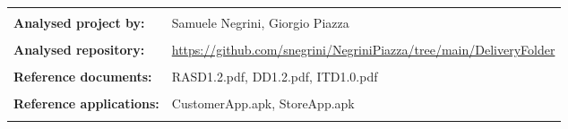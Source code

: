 \begin{table}[h!]
\begin{tabu} to \textwidth { X[0.3,r,p] X[0.7,l,p] }
\hline
\\
\textbf{Analysed project by:} & Samuele Negrini, Giorgio Piazza\\ \\
\textbf{Analysed repository:} & \url{https://github.com/snegrini/NegriniPiazza/tree/main/DeliveryFolder} \\ \\
\textbf{Reference documents:} & RASD1.2.pdf, DD1.2.pdf, ITD1.0.pdf \\ \\
\textbf{Reference applications:} & CustomerApp.apk, StoreApp.apk \\  \\
\hline
\end{tabu}
\end{table}




\setcounter{page}{2}


\newpage
{}
\tableofcontents
\newpage
{}
\listoffigures
{}
\listoftables

\clearpage
{}
\label{sect:introduction}


\clearpage
{}
\label{sect:installation}


\clearpage
{}
\label{sect:testing}



